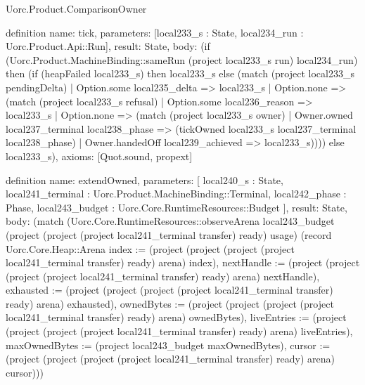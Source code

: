 \begin{lexlean}{Uorc.Product.ComparisonOwner}
\begin{semanticmodule}
definition{
  name: tick,
  parameters: [local233_s : State, local234_run : Uorc.Product.Api::Run],
  result: State,
  body: (if (Uorc.Product.MachineBinding::sameRun (project local233_s run) local234_run) then (if (heapFailed local233_s) then local233_s else (match (project local233_s pendingDelta)
    | Option.some local235_delta => local233_s
    | Option.none => (match (project local233_s refusal)
      | Option.some local236_reason => local233_s
      | Option.none => (match (project local233_s owner)
        | Owner.owned local237_terminal local238_phase => (tickOwned local233_s local237_terminal local238_phase)
        | Owner.handedOff local239_achieved => local233_s)))) else local233_s),
  axioms: [Quot.sound, propext]
}

definition{
  name: extendOwned,
  parameters: [
    local240_s : State,
    local241_terminal : Uorc.Product.MachineBinding::Terminal,
    local242_phase : Phase,
    local243_budget : Uorc.Core.RuntimeResources::Budget
  ],
  result: State,
  body: (match (Uorc.Core.RuntimeResources::observeArena local243_budget (project (project (project local241_terminal transfer) ready) usage) (record Uorc.Core.Heap::Arena {index := (project (project (project (project local241_terminal transfer) ready) arena) index), nextHandle := (project (project (project (project local241_terminal transfer) ready) arena) nextHandle), exhausted := (project (project (project (project local241_terminal transfer) ready) arena) exhausted), ownedBytes := (project (project (project (project local241_terminal transfer) ready) arena) ownedBytes), liveEntries := (project (project (project (project local241_terminal transfer) ready) arena) liveEntries), maxOwnedBytes := (project local243_budget maxOwnedBytes), cursor := (project (project (project (project local241_terminal transfer) ready) arena) cursor)}))
}
\end{semanticmodule}
\end{lexlean}
